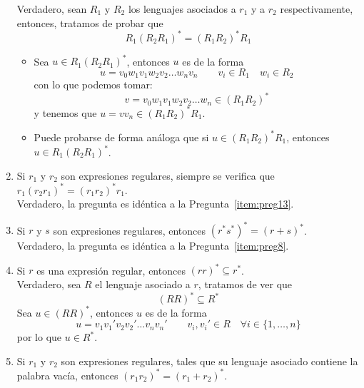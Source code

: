 \begin{enumerate}
        Verdadero, sean $R_1$ y $R_2$ los lenguajes asociados a $r_1$ y a $r_2$ respectivamente, entonces, tratamos de probar que
        \begin{equation*}
            R_1{(R_2R_1)}^{\ast} = {(R_1R_2)}^{\ast}R_1
        \end{equation*}
        \begin{itemize}
            \item Sea $u\in R_1{(R_2R_1)}^{\ast}$, entonces $u$ es de la forma
                \begin{equation*}
                    u = v_0w_1v_1w_2v_2 \ldots w_n v_n \qquad v_i \in R_1 \quad w_i \in R_2
                \end{equation*}
                con lo que podemos tomar:
                \begin{equation*}
                    v = v_0w_1v_1w_2v_2 \ldots w_n \in {(R_1R_2)}^{\ast}
                \end{equation*}
                y tenemos que $u = vv_n \in {(R_1R_2)}^{\ast}R_1$.
            \item Puede probarse de forma análoga que si $u\in {(R_1R_2)}^{\ast}R_1$, entonces $u\in R_1{(R_2R_1)}^{\ast}$.
        \end{itemize}
    \item Si $r_1$ y $r_2$ son expresiones regulares, siempre se verifica que $r_1{(r_2r_1)}^{\ast}={(r_1r_2)}^{\ast}r_1$.\\

        Verdadero, la pregunta es idéntica a la Pregunta~\ref{item:preg13}.
    \item Si $r$ y $s$ son expresiones regulares, entonces ${(r^\ast s^\ast)}^{\ast}={(r+s)}^{\ast}$.\\

        Verdadero, la pregunta es idéntica a la Pregunta~\ref{item:preg8}.
    \item Si $r$ es una expresión regular, entonces ${(rr)}^{\ast}\subseteq r^\ast$.\\

        Verdadero, sea $R$ el lenguaje asociado a $r$, tratamos de ver que 
        \begin{equation*}
            {(RR)}^{\ast} \subseteq  R^\ast
        \end{equation*}
        Sea $u\in {(RR)}^{\ast}$, entonces $u$ es de la forma
        \begin{equation*}
            u = v_1v_1'v_2v_2'\ldots v_nv_n' \qquad v_i, v_i' \in R \quad \forall i \in \{1,\ldots, n\}
        \end{equation*}
        por lo que $u\in R^\ast$.
    \item Si $r_1$ y $r_2$ son expresiones regulares, tales que su lenguaje asociado contiene la palabra vacía, entonces ${(r_1r_2)}^{\ast}={(r_1+r_2)}^{\ast}$.\\


\end{enumerate}
